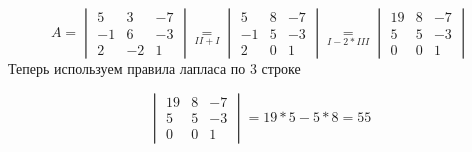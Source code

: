 \documentclass[titlepage]{article}
\begin{document}
\begin{equation}
	A = 
\begin{vmatrix}
	5 & 3 & -7 \\
	-1 & 6 & -3 \\
	2 & -2 & 1
\end{vmatrix}
\underset{II + I}{=} 
\begin{vmatrix}
	5 & 8 & -7 \\
	-1 & 5 & -3 \\
	2 & 0 & 1
\end{vmatrix}
\underset{I - 2 * III}{=} 
\begin{vmatrix}
	19 & 8 & -7 \\
	5 & 5 & -3 \\
	0 & 0 & 1
\end{vmatrix}
\end{equation}
Теперь используем правила лапласа по 3 строке

\begin{equation}
\begin{vmatrix}
	19 & 8 & -7 \\
	5 & 5 & -3 \\
	0 & 0 & 1
\end{vmatrix}
=
19 * 5 - 5 * 8 = 55
\end{equation}
\end{document}
